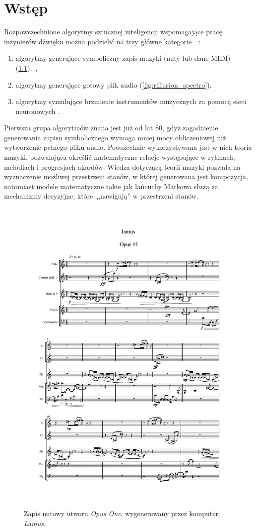 \chapter{Wstęp}

Rozpowszechnione algorytmy sztucznej inteligencji wspomagające pracę inżynierów dźwięku można podzielić na trzy główne kategorie~\cite{analysis_generative}~\label{traditional_algos}:

\begin{enumerate}
    \item algorytmy generujące symboliczny zapis muzyki (nuty lub dane MIDI) (\ref{fig:lamus_notes}),~\cite{zhang2023language},
    \item algorytmy generujące gotowy plik audio (\ref{fig:riffusion_spectro}).
    \item algorytmy symulujące brzmienie instrumentów muzycznych za pomocą sieci neuronowych~\cite{engel2017neural}.
\end{enumerate}

Pierwsza grupa algorytmów znana jest już od lat 80, gdyż zagadnienie generowania zapisu symbolicznego wymaga mniej mocy obliczeniowej niż wytworzenie pełnego pliku audio.
Powszechnie wykorzystywana jest w nich teoria muzyki, pozwalająca określić matematyczne relacje występujące w rytmach, melodiach i progresjach akordów.
Wiedza dotyczącą teorii muzyki pozwala na wyznaczenie możliwej przestrzeni stanów, w której generowana jest kompozycja,
natomiast modele matematyczne takie jak łańcuchy Markowa służą za mechanizmy decyzyjne, które~,,nawigują'' w przestrzeni stanów.

\begin{figure}[H]
    \centering
    \includegraphics[width=0.4\linewidth]{rys01/lamus_notes.jpg}
    \caption{
      Zapis nutowy utworu \textit{Opus One},
      wygenerowany przez komputer \textit{Lamus}.
    }\label{fig:lamus_notes}
\end{figure}

